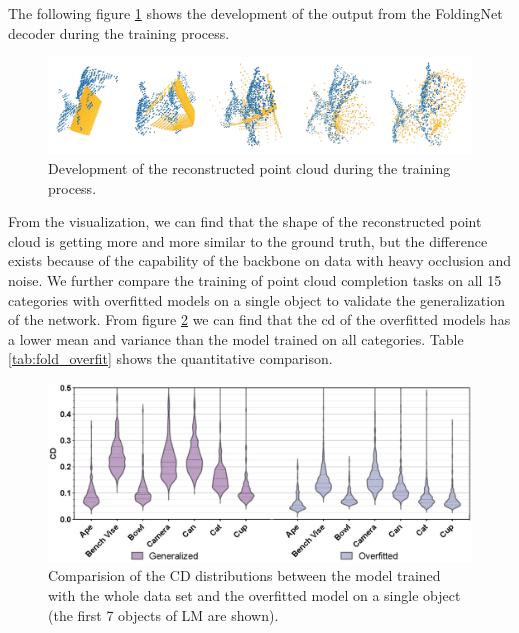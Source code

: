 \documentclass[12pt,DIV14,BCOR12mm,a4paper,footinclude=false,headinclude,parskip=half-,twoside,openright,cleardoublepage=empty,toc=index,bibliography=totoc,listof=totoc]{scrreprt}
\numberwithin{equation}{chapter}
\begin{document}
The following figure \ref{img:fold_dev} shows the development of the output from the FoldingNet decoder during the training process.

\begin{figure}[h]
	\centering
	\includegraphics[width=1.\textwidth]{img/fold_dev.pdf}
	\caption{Development of the reconstructed point cloud during the training process.}
	\label{img:fold_dev}
\end{figure}

From the visualization, we can find that the shape of the reconstructed point cloud is getting more and more similar to the ground truth, but the difference exists because of the capability of the backbone on data with heavy occlusion and noise. We further compare the training of point cloud completion tasks on all 15 categories with overfitted models on a single object to validate the generalization of the network. From figure \ref{img:fold_overfit} we can find that the \gls{cd} of the overfitted models has a lower mean and variance than the model trained on all categories. Table \ref{tab:fold_overfit} shows the quantitative comparison.
\begin{figure}[h]
	\centering
	\includegraphics[width=1.\textwidth]{img/fold_overfit.eps}
	\caption{Comparision of the CD distributions between the model trained with the whole data set and the overfitted model on a single object (the first 7 objects of LM are shown).}
	\label{img:fold_overfit}
\end{figure}
\end{document}
